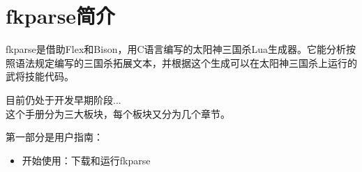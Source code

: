 \chapter{fkparse简介}

fkparse是借助Flex和Bison，用C语言编写的太阳神三国杀Lua生成器。它能分析按照语法规定编写的三国杀拓展文本，并根据这个生成可以在太阳神三国杀上运行的武将技能代码。

目前仍处于开发早期阶段... \\

这个手册分为三大板块，每个板块又分为几个章节。

第一部分是用户指南：

\begin{itemize}
 \item 开始使用：下载和运行fkparse
\end{itemize}


